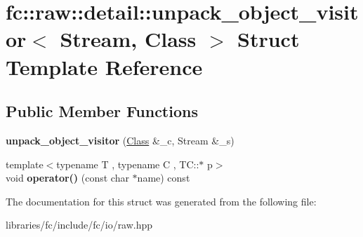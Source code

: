 \hypertarget{structfc_1_1raw_1_1detail_1_1unpack__object__visitor}{}\section{fc\+:\+:raw\+:\+:detail\+:\+:unpack\+\_\+object\+\_\+visitor$<$ Stream, Class $>$ Struct Template Reference}
\label{structfc_1_1raw_1_1detail_1_1unpack__object__visitor}
\subsection*{Public Member Functions}
\begin{DoxyCompactItemize}
\item 
\mbox{\label{structfc_1_1raw_1_1detail_1_1unpack__object__visitor_a67aba3c76d467e91d6b81a1cbbe39994}} 
{\bfseries unpack\+\_\+object\+\_\+visitor} (\mbox{\hyperlink{class_class}{Class}} \&\+\_\+c, Stream \&\+\_\+s)
\item 
\mbox{\label{structfc_1_1raw_1_1detail_1_1unpack__object__visitor_afb18bd4ffc10e2a0295984a7782a6f63}} 
{\footnotesize template$<$typename T , typename C , T\+C\+::$\ast$ p$>$ }\\void {\bfseries operator()} (const char $\ast$name) const
\end{DoxyCompactItemize}


The documentation for this struct was generated from the following file\+:\begin{DoxyCompactItemize}
\item 
libraries/fc/include/fc/io/raw.\+hpp\end{DoxyCompactItemize}
